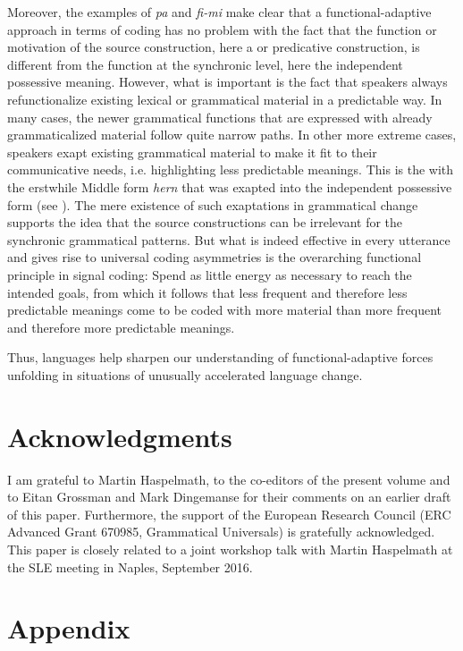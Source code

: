 \documentclass[output=paper]{langsci/langscibook}
\begin{document}
Moreover, the examples of  \textit{pa} and  \textit{fi-mi} make clear that a functional-adaptive approach in terms of coding  has no problem with the fact that the function or motivation of the source construction, here a  or predicative construction, is different from the function at the synchronic level, here the independent possessive meaning. However, what is important is the fact that speakers always refunctionalize existing lexical or grammatical material in a predictable way. In many cases, the newer grammatical functions that are expressed with already grammaticalized material follow quite narrow  paths. In other more extreme cases, speakers exapt existing grammatical material to make it fit to their communicative needs, i.e. highlighting less predictable meanings. This is the  with the erstwhile Middle    form \textit{hern} that was exapted into the independent possessive form (see ). The mere existence of such exaptations in grammatical change supports the idea that the source constructions can be irrelevant for the synchronic grammatical patterns. But what is indeed effective in every utterance and gives rise to universal coding asymmetries is the overarching functional  principle in signal coding: Spend as little energy as necessary to reach the intended goals, from which it follows that less frequent and therefore less predictable meanings come to be coded with more material than more frequent and therefore more predictable meanings.

Thus,  languages help sharpen our understanding of functional-adaptive forces unfolding in situations of unusually accelerated language change.

\section*{Acknowledgments}

I am grateful to Martin Haspelmath, to the co-editors of the present volume and to Eitan Grossman and Mark Dingemanse for their comments on an earlier draft of this paper. Furthermore, the support of the European Research Council (ERC Advanced Grant 670985, Grammatical Universals) is gratefully acknowledged. This paper is closely related to a joint workshop talk with Martin Haspelmath at the SLE meeting in Naples,  {September 2016}.

\section*{Appendix}
\end{document}

